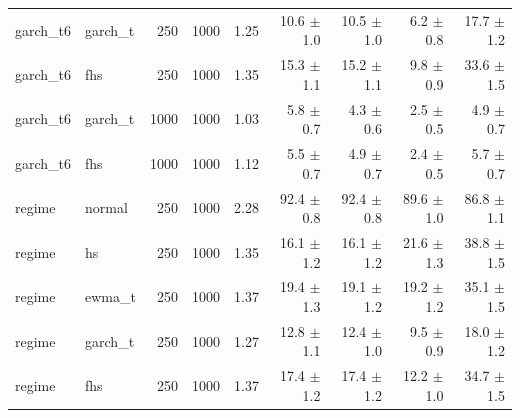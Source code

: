\begin{table}[H]
\begin{tabular}{llrrrrrrr}
garch\_t6 & garch\_t & 250 & 1000 & 1.25 & 10.6 $\pm$ 1.0 & 10.5 $\pm$ 1.0 & 6.2 $\pm$ 0.8 & 17.7 $\pm$ 1.2 \\
garch\_t6 & fhs & 250 & 1000 & 1.35 & 15.3 $\pm$ 1.1 & 15.2 $\pm$ 1.1 & 9.8 $\pm$ 0.9 & 33.6 $\pm$ 1.5 \\
garch\_t6 & garch\_t & 1000 & 1000 & 1.03 & 5.8 $\pm$ 0.7 & 4.3 $\pm$ 0.6 & 2.5 $\pm$ 0.5 & 4.9 $\pm$ 0.7 \\
garch\_t6 & fhs & 1000 & 1000 & 1.12 & 5.5 $\pm$ 0.7 & 4.9 $\pm$ 0.7 & 2.4 $\pm$ 0.5 & 5.7 $\pm$ 0.7 \\
regime & normal & 250 & 1000 & 2.28 & 92.4 $\pm$ 0.8 & 92.4 $\pm$ 0.8 & 89.6 $\pm$ 1.0 & 86.8 $\pm$ 1.1 \\
regime & hs & 250 & 1000 & 1.35 & 16.1 $\pm$ 1.2 & 16.1 $\pm$ 1.2 & 21.6 $\pm$ 1.3 & 38.8 $\pm$ 1.5 \\
regime & ewma\_t & 250 & 1000 & 1.37 & 19.4 $\pm$ 1.3 & 19.1 $\pm$ 1.2 & 19.2 $\pm$ 1.2 & 35.1 $\pm$ 1.5 \\
regime & garch\_t & 250 & 1000 & 1.27 & 12.8 $\pm$ 1.1 & 12.4 $\pm$ 1.0 & 9.5 $\pm$ 0.9 & 18.0 $\pm$ 1.2 \\
regime & fhs & 250 & 1000 & 1.37 & 17.4 $\pm$ 1.2 & 17.4 $\pm$ 1.2 & 12.2 $\pm$ 1.0 & 34.7 $\pm$ 1.5 \\
\bottomrule
\end{tabular}
\end{table}
